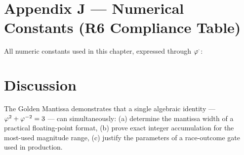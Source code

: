 \section{Appendix J — Numerical Constants (R6 Compliance Table)}
\label{sec:appendix-j}

All numeric constants used in this chapter, expressed through
\(\varphi^{\cdot}\):

\begin{center}
\end{center}

\section{Discussion}
\label{sec:discussion}

The Golden Mantissa demonstrates that a single algebraic identity —
\(\varphi^{2}+\varphi^{-2}=3\) — can simultaneously:
(a) determine the mantissa width of a practical floating-point format,
(b) prove exact integer accumulation for the most-used magnitude range,
(c) justify the parameters of a race-outcome gate used in production.

